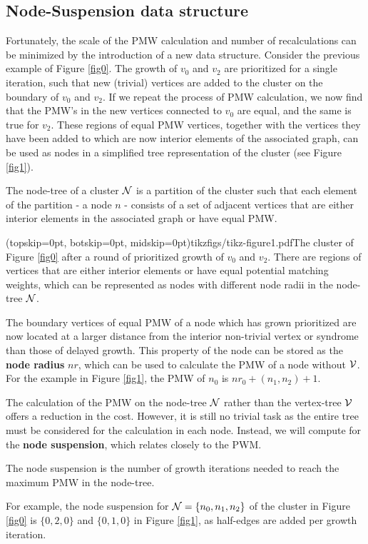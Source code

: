 \subsection{Node-Suspension data structure}\label{sec:nodeset}

Fortunately, the scale of the PMW calculation and number of recalculations can be minimized by the introduction of a new data structure. 
Consider the previous example of Figure \ref{fig0}. The growth of $v_0$ and $v_2$ are prioritized for a single iteration, such that new (trivial) vertices are added to the cluster on the boundary of $v_0$ and $v_2$. If we repeat the process of PMW calculation, we now find that the PMW's in the new vertices connected to $v_0$ are equal, and the same is true for $v_2$. These regions of equal PMW vertices, together with the vertices they have been added to which are now interior elements of the associated graph, can be used as nodes in a simplified tree representation of the cluster (see Figure \ref{fig1}). 

\begin{definition}
  The node-tree of a cluster $\mathcal{N}$ is a partition of the cluster such that each element of the partition - a node $n$ - consists of a set of adjacent vertices that are either interior elements in the associated graph or have equal PMW. 
\end{definition}

\Figure[htb](topskip=0pt, botskip=0pt, midskip=0pt){tikzfigs/tikz-figure1.pdf}{The cluster of Figure \ref{fig0} after a round of prioritized growth of $v_0$ and $v_2$. There are regions of vertices that are either interior elements or have equal potential matching weights, which can be represented as nodes with different node radii in the node-tree $\mathcal{N}$. \label{fig1}}

The boundary vertices of equal PMW of a node which has grown prioritized are now located at a larger distance from the interior non-trivial vertex or syndrome than those of delayed growth. This property of the node can be stored as the \textbf{node radius} $nr$, which can be used to calculate the PMW of a node without $\mathcal{V}$. For the example in Figure \ref{fig1}, the PMW of $n_0$ is $nr_0 + (n_1, n_2) + 1$.

The calculation of the PMW on the node-tree $\mathcal{N}$ rather than the vertex-tree $\mathcal{V}$ offers a reduction in the cost. However, it is still no trivial task as the entire tree must be considered for the calculation in each node. Instead, we will compute for the \textbf{node suspension}, which relates closely to the PWM. 
\begin{definition}
  The node suspension is the number of growth iterations needed to reach the maximum PMW in the node-tree. 
\end{definition}
For example, the node suspension for $\mathcal{N} = \{n_0, n_1, n_2\}$ of the cluster in Figure \ref{fig0} is $\{0, 2, 0\}$ and $\{0, 1, 0\}$ in Figure \ref{fig1}, as half-edges are added per growth iteration. 

